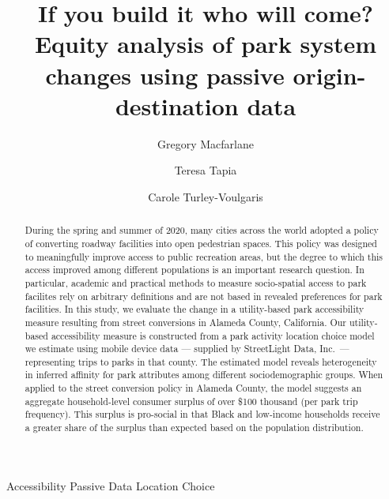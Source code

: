 \documentclass[3p, authoryear]{elsarticle} %
\begin{document}
\begin{frontmatter}

  \title{If you build it who will come? Equity analysis of park system changes using passive origin-destination data}
    \author[BYU]{Gregory Macfarlane}
    \author[StreetLight]{Teresa Tapia}
    \author[Harvard]{Carole Turley-Voulgaris}
      \address[BYU]{Brigham Young University, Civil and Environmental Engineering Department, 430 Engineering Building, Provo, Utah 84602}
    \address[Harvard]{Harvard Graduate School of Design, 48 Quincy St, Cambridge, Massachussetts 02138}
    \address[StreetLight]{StreetLight Data, Inc., San Francisco, California}
  
  \begin{abstract}
  During the spring and summer of 2020, many cities across the world adopted a
  policy of converting roadway facilities into open pedestrian spaces. This
  policy was designed to meaningfully improve access to public recreation areas,
  but the degree to which this access improved among different populations is an
  important research question. In particular, academic and practical methods
  to measure socio-spatial access to park facilites rely on arbitrary definitions
  and are not based in revealed preferences for park facilities. In this study,
  we evaluate the change in a utility-based park accessibility measure resulting
  from street conversions in Alameda County, California. Our utility-based
  accessibility measure is constructed from a park activity location choice model
  we estimate using mobile device data --- supplied by StreetLight Data, Inc.~---
  representing trips to parks in that county. The estimated model reveals
  heterogeneity in inferred affinity for park attributes among different
  sociodemographic groups. When applied to the street conversion policy in
  Alameda County, the model suggests an aggregate household-level consumer surplus
  of over \$100 thousand (per park trip frequency). This surplus is pro-social
  in that Black and low-income households receive a greater share of the
  surplus than expected based on the population distribution.
  \end{abstract}
   \begin{keyword} Accessibility Passive Data Location Choice\end{keyword}
 \end{frontmatter}
\end{document}
